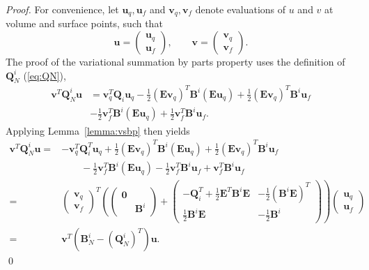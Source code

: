 \documentclass{svjour3}                     %
\newcommand{\LRp}[1]{\left( #1 \right)}
\begin{document}
\begin{proof}
For convenience, let $\bm{u}_q, \bm{u}_f$ and $\bm{v}_q, \bm{v}_f$ denote evaluations of $u$ and $v$ at volume and surface points, such that 
\[
\bm{u} = \begin{pmatrix} \bm{u}_q\\ \bm{u}_f\end{pmatrix}, \qquad \bm{v} = \begin{pmatrix} \bm{v}_q\\ \bm{v}_f\end{pmatrix}.  
\]
The proof of the variational summation by parts property uses the definition of $\bm{Q}^i_N$ (\ref{eq:QN}), 
\begin{align*}
\bm{v}^T\bm{Q}^i_N\bm{u} &= \bm{v}_q^T\bm{Q}_i \bm{u}_q - \frac{1}{2}\LRp{\bm{E}\bm{v}_q}^T\bm{B}^i \LRp{\bm{E}\bm{u}_q} + \frac{1}{2}\LRp{\bm{E}\bm{v}_q}^T\bm{B}^i \bm{u}_f\\
& - \frac{1}{2}\bm{v}_f^T\bm{B}^i \LRp{\bm{E}\bm{u}_q} + \frac{1}{2}\bm{v}_f^T\bm{B}^i \bm{u}_f.
\end{align*}
Applying Lemma~\ref{lemma:vsbp} then yields
\begin{align*}
\bm{v}^T\bm{Q}^i_N\bm{u} =& -\bm{v}_q^T\bm{Q}^T_i \bm{u}_q + \frac{1}{2}\LRp{\bm{E}\bm{v}_q}^T\bm{B}^i \LRp{\bm{E}\bm{u}_q} + \frac{1}{2}\LRp{\bm{E}\bm{v}_q}^T\bm{B}^i \bm{u}_f\\
&\qquad - \frac{1}{2}\bm{v}_f^T\bm{B}^i \LRp{\bm{E}\bm{u}_q} - \frac{1}{2}\bm{v}_f^T\bm{B}^i \bm{u}_f + \bm{v}_f^T\bm{B}^i \bm{u}_f\\
=& \begin{pmatrix} \bm{v}_q\\ \bm{v}_f\end{pmatrix}^T 
\left(\begin{pmatrix}
\bm{0}& \\
& \bm{B}^i
\end{pmatrix}\right.+
\left.\begin{pmatrix}
-\bm{Q}_i^T + \frac{1}{2}{\bm{E}}^T\bm{B}^i \bm{E} & -\frac{1}{2} \LRp{\bm{B}^i \bm{E}}^T\\
\frac{1}{2}\bm{B}^i \bm{E} & -\frac{1}{2}\bm{B}^i
\end{pmatrix}  \right)
\begin{pmatrix} \bm{u}_q\\ \bm{u}_f\end{pmatrix}\\
=& \bm{v}^T\LRp{\bm{B}^i_N - \LRp{\bm{Q}^i_N}^T}\bm{u}.
\end{align*}
\qed\end{proof}
\end{document}
